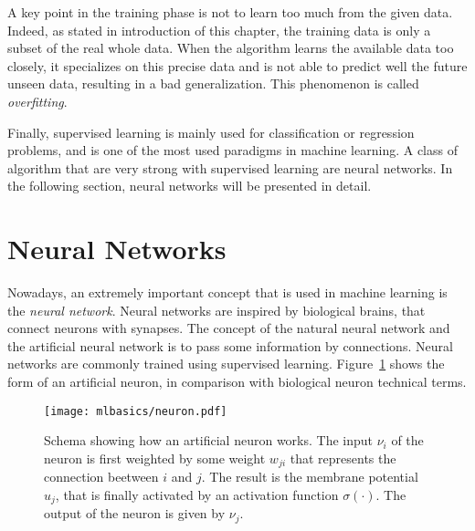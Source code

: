 A key point in the training phase is not to learn too much from the given data. Indeed, as stated in introduction of this chapter, the training data is only a subset of the real whole data. When the algorithm learns the available data too closely, it specializes on this precise data and is not able to predict well the future unseen data, resulting in a bad generalization. This phenomenon is called \emph{overfitting}.

Finally, supervised learning is mainly used for classification or regression problems, and is one of the most used paradigms in machine learning. A class of algorithm that are very strong with supervised learning are neural networks. In the following section, neural networks will be presented in detail.

\section{Neural Networks}
Nowadays, an extremely important concept that is used in machine learning is the \emph{neural network}. Neural networks are inspired by biological brains, that connect neurons with synapses. The concept of the natural neural network and the artificial neural network is to pass some information by connections. Neural networks are commonly trained using supervised learning. Figure~\ref{fig:neuron} shows the form of an artificial neuron, in comparison with biological neuron technical terms.
\begin{figure}[t!]
  \centering
  \texttt{[image: mlbasics/neuron.pdf]}
  \caption[Schema of an artificial neuron]{Schema showing how an artificial neuron works. The input $\nu_i$ of the neuron is first weighted by some weight $w_{ji}$ that represents the connection beetween $i$ and $j$. The result is the membrane potential $u_j$, that is finally activated by an activation function $\sigma(\cdot)$. The output of the neuron is given by $\nu_j$.}
  \label{fig:neuron}
\end{figure}

